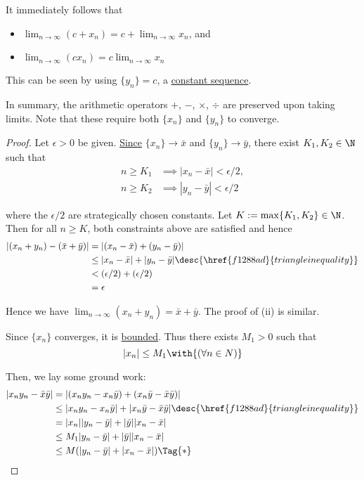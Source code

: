It immediately follows that
\begin{itemize}
  \item $\displaystyle\lim_{n\to\infty}(c+x_n)=c+\lim_{n\to\infty}x_n$, and
  \item $\displaystyle\lim_{n\to\infty}(cx_n)=c\lim_{n\to\infty}x_n$
\end{itemize}

This can be seen by using $\{y_n\}=c$, a \href{d661313}{constant sequence}.

In summary, the arithmetic operators $+$, $-$, $\times$, $\div$ are preserved
upon taking limits. Note that these require both $\{x_n\}$ and $\{y_n\}$ to
converge.

\begin{proof}
   Let $\epsilon>0$ be given. \href{e565120}{Since} $\{x_n\}\to\bar
  x$ and $\{y_n\}\to\bar y$, there exist $K_1,K_2\in\N$ such that
  \begin{align*}
    n\geq K_1 &\implies |x_n-\bar x|<\epsilon/2, \\
    n\geq K_2 &\implies |y_n-\bar y|<\epsilon/2
  \end{align*}

  where the $\epsilon/2$ are strategically chosen constants. Let
  $K:=\max\{K_1,K_2\}\in\N$. Then for all $n\geq K$, both constraints above are
  satisfied and hence
  \begin{align*}
    |(x_n+y_n)-(\bar x+\bar y)|
     &=|(x_n-\bar x)+(y_n-\bar y)|                                            \\
     &\leq|x_n-\bar x|+|y_n-\bar y|\desc{\href{f1288ad}{triangle inequality}} \\
     &<(\epsilon/2)+(\epsilon/2)                                              \\
     &=\epsilon
  \end{align*}

  Hence we have $\lim_{n\to\infty}(x_n+y_n)=\bar x+\bar y$. The proof of (ii)
  is similar.

   Since $\{x_n\}$ converges, it is \href{d5ed299}{bounded}. Thus
  there exists $M_1>0$ such that
  $$
    |x_n|\leq M_1\with{(\forall n\in N)}
  $$

  Then, we lay some ground work:
  \begin{align*}
    |x_ny_n-\bar x\bar y|
     &=|(x_ny_n-x_n\bar y)+(x_n\bar y-\bar x\bar y)|                                            \\
     &\leq|x_ny_n-x_n\bar y|+|x_n\bar y-\bar x\bar y|\desc{\href{f1288ad}{triangle inequality}} \\
     &=|x_n||y_n-\bar y|+|\bar y||x_n-\bar x|                                                   \\
     &\leq M_1|y_n-\bar y|+|\bar y||x_n-\bar x|                                                 \\
     &\leq M(|y_n-\bar y|+|x_n-\bar x|)\Tag{*}
  \end{align*}


\end{proof}

